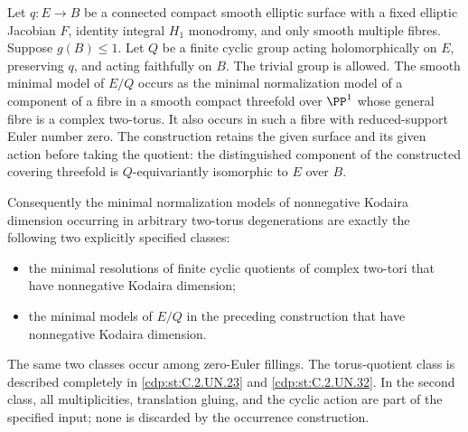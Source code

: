 
\begin{proposition}\label{cdp:st:C.2.UN.35}
Let $q:E\to B$ be a connected compact smooth elliptic
surface with a fixed elliptic Jacobian $F$, identity
integral $H_1$ monodromy, and only smooth multiple
fibres. Suppose $g(B)\le1$. Let $Q$ be a finite
cyclic group acting holomorphically on $E$, preserving
$q$, and acting faithfully on $B$. The trivial group
is allowed. The smooth minimal model of $E/Q$ occurs
as the minimal normalization model of a component of
a fibre in a smooth compact threefold over $\PP^1$
whose general fibre is a complex two-torus. It also
occurs in such a fibre with reduced-support Euler
number zero. The construction retains the given
surface and its given action before taking the
quotient: the distinguished component of the
constructed covering threefold is $Q$-equivariantly
isomorphic to $E$ over $B$.

Consequently the minimal normalization models of
nonnegative Kodaira dimension occurring in arbitrary
two-torus degenerations are exactly the following
two explicitly specified classes:
\begin{itemize}
\item the minimal resolutions of finite cyclic
quotients of complex two-tori that have nonnegative
Kodaira dimension;
\item the minimal models of $E/Q$ in the preceding
construction that have nonnegative Kodaira dimension.
\end{itemize}
The same two classes occur among zero-Euler fillings.
The torus-quotient class is described completely in
\ref{cdp:st:C.2.UN.23} and \ref{cdp:st:C.2.UN.32}. In the second class, all multiplicities,
translation gluing, and the cyclic action are part
of the specified input; none is discarded by the
occurrence construction.
\end{proposition}


